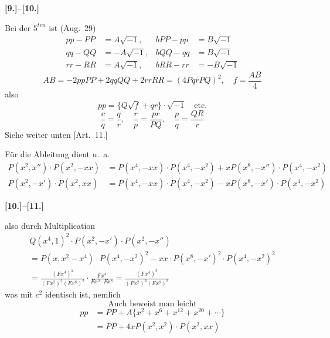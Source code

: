 \documentclass[10pt,a4paper]{article}
\begin{document}
\newpage
\textbf{[9.]--[10.]}

Bei der $5^{ten}$ ist (Aug.\ 29)
%
\begin{align*}
pp - PP &= A\sqrt{-1}, & bPP - pp &= B\sqrt{-1} \\
qq - QQ &= -A\sqrt{-1}, & bQQ - qq &= B\sqrt{-1} \\
rr - RR &= A\sqrt{-1}, & bRR - rr &= -B\sqrt{-1}
\end{align*}
%
\begin{equation*}
AB = -2ppPP + 2qqQQ + 2rrRR = (4PqrPQ)^2, \quad f = \frac{AB}{4}
\end{equation*}
%
also
%
\begin{equation*}
pp = \{Q\sqrt{f} + qr\} \cdot \sqrt{-1} \quad \text{etc.}
\end{equation*}
%
\begin{equation*}
\frac{c}{q} = \frac{q}{r}, \quad \frac{r}{p} = \frac{pr}{PQ}, \quad \frac{p}{q} = \frac{QR}{r}
\end{equation*}
Siehe weiter unten [Art.\ 11.]

F\"ur die Ableitung dient u.\ a.
%
\begin{align*}
P(x^2, x'') \cdot P(x^2, -xx) &= P(x^4, -xx) \cdot P(x^4, -x^2) + xP(x^8, -x'') \cdot P(x^4, -x^2) \\
P(x^2, -x') \cdot P(x^2, xx) &= P(x^4, -xx) \cdot P(x^4, -x^2) - xP(x^8, -x') \cdot P(x^4, -x^2)
\end{align*}

\newpage
\textbf{[10.]--[11.]}

also durch Multiplication
%
\begin{multline*}
Q(x^4, 1)^2 \cdot P(x^2, -x') \cdot P(x^2, -x'') \\
= P(x, x^2 - x^4) \cdot P(x^4, -x^2)^2 - xx \cdot P(x^8, -x')^2 \cdot P(x^4, -x^2)^2 \\
= \frac{(Fx^4)^2}{(Fx^2)^2(Fx^8)^2} \cdot \frac{Fx^4}{Fx^2 \cdot Fx^8} = \frac{(Fx^4)^3}{(Fx^2)^3(Fx^8)^3}
\end{multline*}
%
was mit $c^2$ identisch ist, nemlich
%
\begin{equation*}
\text{Auch beweist man leicht}
\end{equation*}
%
\begin{align*}
pp &= PP + A\{x^2 + x^6 + x^{12} + x^{20} + \cdots\} \\
&= PP + 4xP(x^2, x^2) \cdot P(x^2, xx)
\end{align*}
\end{document}
